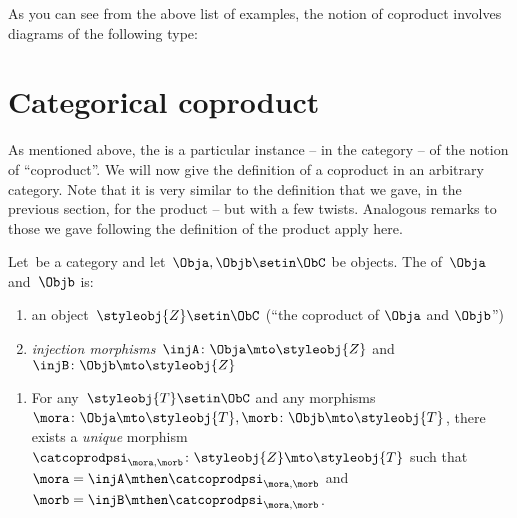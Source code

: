
As you can see from the above list of examples, the notion of coproduct involves diagrams of the following type:
%

\section{Categorical coproduct}

As mentioned above, the  is a particular instance -- in the category \Set  -- of the notion of ``coproduct''.
We will now give the definition of a coproduct in an arbitrary category.
Note that it is very similar to the definition that we gave, in the previous section, for the product -- but with a few twists.
Analogous remarks to those we gave following the definition of the product apply here.

\begin{ctdefinition}
    \label{def:categorical-coproduct}
    Let~\CatC be a category and let~$\Obja, \Objb \setin \ObC$ be objects.
    The  of~$\Obja$ and~$\Objb$ is: \\
    \constit
    \begin{enumerate}
        \item an object~$\styleobj{Z} \setin \ObC$ (``the coproduct of $\Obja$ and $\Objb$'')
        \item \emph{injection morphisms}~$\injA \colon \Obja \mto \styleobj{Z} $ and~$\injB \colon \Objb \mto \styleobj{Z} $
    \end{enumerate}
    \condit
    \begin{enumerate}
        \item For any~$\styleobj{T} \setin \ObC$ and any morphisms~$\mora \colon  \Obja \mto \styleobj{T}, \morb \colon \Objb \mto \styleobj{T}$, there exists a \emph{unique} morphism~$\catcoprodpsi_{\mora, \morb} \colon \styleobj{Z} \mto \styleobj{T}$ such that~$\mora = \injA\mthen \catcoprodpsi_{\mora, \morb}$ and~$\morb = \injB \mthen \catcoprodpsi_{\mora,\morb}$.
    \end{enumerate}
\end{ctdefinition}

